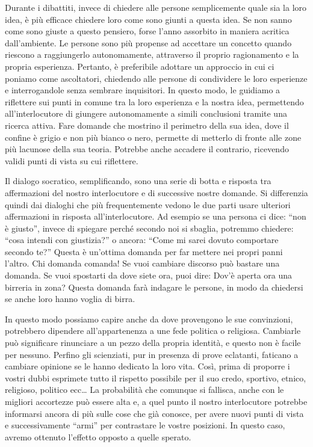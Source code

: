 \documentclass[12pt]{book} %
\begin{document}
Durante i dibattiti, invece di chiedere alle persone semplicemente quale sia la loro idea, è più efficace chiedere loro
come sono giunti a questa idea. Se non sanno come sono giuste a questo pensiero, forse l'anno assorbito in maniera acritica dall'ambiente.
Le persone sono più propense ad accettare un concetto quando riescono a raggiungerlo
autonomamente, attraverso il proprio ragionamento e la propria esperienza. Pertanto, è preferibile adottare un
approccio in cui ci poniamo come ascoltatori, chiedendo alle persone di condividere le loro esperienze e interrogandole
senza sembrare inquisitori. In questo modo, le guidiamo a riflettere sui punti in comune tra la loro esperienza e la
nostra idea, permettendo all'interlocutore di giungere autonomamente a simili conclusioni tramite una ricerca
attiva. Fare domande che mostrino il perimetro della sua idea, dove il confine è grigio e non più bianco o nero, permette di metterlo di fronte alle zone più lacunose della sua teoria. Potrebbe anche accadere il contrario, ricevendo validi punti di vista su cui riflettere. 

Il dialogo socratico, semplificando, sono una serie di botta e risposta tra affermazioni del nostro interlocutore e
di successive nostre domande. Si differenzia quindi dai dialoghi che più frequentemente vedono le due parti usare
ulteriori affermazioni in risposta all'interlocutore. Ad esempio se una persona ci dice: “non è
giusto”, invece di spiegare perché secondo noi si sbaglia, potremmo chiedere: “cosa intendi con giustizia?” o ancora: “Come mi sarei dovuto comportare secondo te?” Questa è un'ottima domanda per far mettere nei propri panni l'altro.
Chi domanda comanda! Se vuoi cambiare discorso può bastare una domanda. Se vuoi spostarti da dove siete ora, puoi dire: Dov'è aperta ora una birreria in zona? Questa domanda farà indagare le persone, in modo da chiedersi se anche loro hanno voglia di birra.

In questo modo possiamo capire anche da dove provengono le sue convinzioni, potrebbero dipendere
all'appartenenza a une fede politica o religiosa. Cambiarle può significare rinunciare a un pezzo della
propria identità, e questo non è facile per nessuno. Perfino gli scienziati, pur in presenza di prove eclatanti,
faticano a cambiare opinione se le hanno dedicato la loro vita. Così, prima di proporre
i vostri dubbi esprimete tutto il rispetto possibile per il suo credo, sportivo, etnico, religioso, politico ecc…
La probabilità che comunque si fallisca, anche con le migliori accortezze può essere
alta e, a quel punto il nostro interlocutore potrebbe informarsi ancora di più sulle cose che già conosce, per avere
nuovi punti di vista e successivamente “armi” per contrastare le vostre posizioni. In questo caso, avremo ottenuto l'effetto opposto a quelle sperato.
\end{document}
